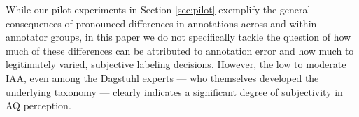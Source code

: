 While our pilot experiments in Section \ref{sec:pilot} exemplify the general consequences of pronounced differences in annotations across and within annotator groups, in this paper we do not specifically tackle the question of how much of these differences can be attributed to annotation error and how much to legitimately varied, subjective labeling decisions. However, the low to moderate IAA, even among the Dagstuhl experts --- who themselves developed the underlying taxonomy --- clearly indicates a significant degree of subjectivity in AQ perception.
